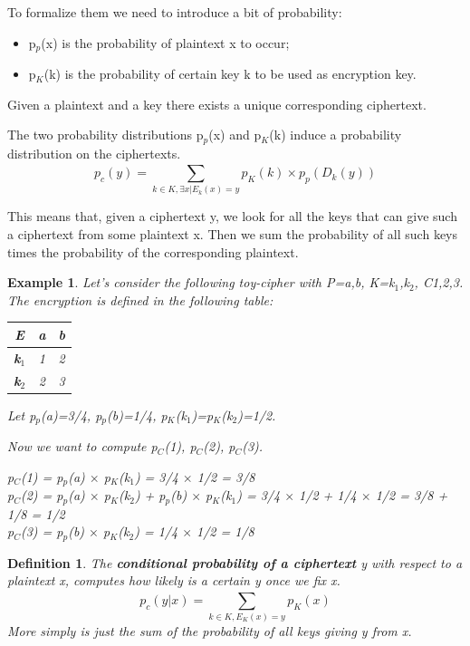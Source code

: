 \documentclass[a4paper, 12pt]{report}
\newtheorem{definition}{\textbf{Definition}}
\newtheorem{example}{\textbf{Example}}
\begin{document}
To formalize them we need to introduce a bit of probability:
\begin{itemize}
	\item p$_p$(x) is the probability of plaintext x to occur;
	\item p$_K$(k) is the probability of certain key k to be used as encryption key.
\end{itemize}
Given a plaintext and a key there exists a unique corresponding ciphertext.

The two probability distributions p$_p$(x) and p$_K$(k) induce a probability distribution on the ciphertexts.
\setcounter{equation}{0}
\begin{equation}
	p_c(y) = \sum_{k \in K, \exists x |E_k(x)=y}^{} p_K(k)\times p_p(D_k(y))
\end{equation}

This means that, given a ciphertext y, we look for all the keys that can give such a ciphertext from some plaintext x. Then we sum the probability of all such keys times the probability of the corresponding plaintext.
\begin{example}
	Let's consider the following toy-cipher with P={a,b}, K={k$_1$,k$_2$}, C{1,2,3}. The encryption is defined in the following table:

	\begin{table}[h!]
		\centering
		\begin{tabular}{|c | c c|} 
			\hline
			\textbf{E} & \textbf{a} & \textbf{b} \\ 
			\hline
			\textbf{k$_1$} & 1 & 2 \\ 
			\textbf{k$_2$} & 2 & 3 \\ 
			\hline
		\end{tabular}
		\label{tab:exmpPerfciph}
	\end{table}

	Let p$_p$(a)=3/4, p$_p$(b)=1/4, p$_K$(k$_1$)=p$_K$(k$_2$)=1/2.
	
	Now we want to compute p$_C$(1), p$_C$(2), p$_C$(3).
	
	p$_C$(1) = p$_p$(a) $\times$ p$_{K}$(k$_1$) = 3/4 $\times$ 1/2 = 3/8\\
	p$_C$(2) = p$_p$(a) $\times$ p$_{K}$(k$_2$) + p$_p$(b) $\times$ p$_{K}$(k$_1$) = 3/4 $\times$ 1/2 + 1/4 $\times$ 1/2 = 3/8 + 1/8 = 1/2\\ 
	p$_C$(3) = p$_p$(b) $\times$ p$_{K}$(k$_2$) = 1/4 $\times$ 1/2 = 1/8\\
\end{example}

\begin{definition}
	The \textbf{conditional probability of a ciphertext} y with respect to a plaintext x, computes how likely is a certain y once we fix x.
	\setcounter{equation}{0}
	\begin{equation}
		p_c(y|x) = \sum_{k\in K, E_K(x)=y}^{} p_K(x)
	\end{equation}
	More simply is just the sum of the probability of all keys giving y from x.
\end{definition}
\end{document}
